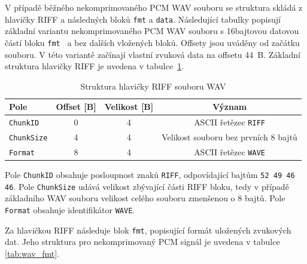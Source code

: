 V případě běžného nekomprimovaného PCM WAV souboru se struktura skládá
z hlavičky RIFF a následných bloků \texttt{fmt} a \texttt{data}. Následující tabulky popisují základní variantu nekomprimovaného PCM WAV souboru s 16bajtovou datovou částí bloku \texttt{fmt } a bez dalších vložených bloků. Offsety jsou uváděny od začátku souboru. V této variantě začínají vlastní zvuková data na offsetu 44~B.
Základní struktura hlavičky RIFF je uvedena v tabulce~\ref{tab:wav_riff_header}.

\begin{table}[ht]
    \centering
    \caption{Struktura hlavičky RIFF souboru WAV}
    \label{tab:wav_riff_header}
    \begin{tabular}{lccc}
        \toprule
        \textbf{Pole} & \textbf{Offset [B]} & \textbf{Velikost [B]} & \textbf{Význam} \\
        \midrule
        \texttt{ChunkID}   & 0 & 4 & ASCII řetězec \texttt{RIFF} \\
        \texttt{ChunkSize} & 4 & 4 & Velikost souboru bez prvních 8 bajtů \\
        \texttt{Format}    & 8 & 4 & ASCII řetězec \texttt{WAVE} \\
        \bottomrule
    \end{tabular}
\end{table}

Pole \texttt{ChunkID} obsahuje posloupnost znaků \texttt{RIFF}, odpovídající bajtům \texttt{52 49 46 46}. Pole \texttt{ChunkSize}
udává velikost zbývající části RIFF bloku, tedy v případě základního
WAV souboru velikost celého souboru zmenšenou o 8 bajtů. Pole
\texttt{Format} obsahuje identifikátor \texttt{WAVE}.

Za hlavičkou RIFF následuje blok \texttt{fmt}, popisující formát uložených zvukových dat. Jeho struktura pro nekomprimovaný PCM signál je uvedena v tabulce \ref{tab:wav_fmt}.


